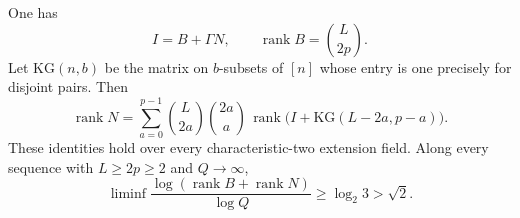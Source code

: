 \begin{proposition}
\label{prop:higher-car-grouping}
One has
\[
 I=B+\Gamma N,\qquad \operatorname{rank}B=\binom L{2p}.
\]
Let $\mathrm{KG}(n,b)$ be the matrix on $b$-subsets of $[n]$ whose
entry is one precisely for disjoint pairs. Then
\begin{equation}\label{eq:higher-car-rank}
 \operatorname{rank}N
 =\sum_{a=0}^{p-1}\binom L{2a}\binom{2a}a\,
   \operatorname{rank}\bigl(I+\mathrm{KG}(L-2a,p-a)\bigr).
\end{equation}
These identities hold over every characteristic-two extension field.
Along every sequence with $L\ge2p\ge2$ and $Q\to\infty$,
\begin{equation}\label{eq:higher-car-exponent}
 \liminf\frac{\log(\operatorname{rank}B+\operatorname{rank}N)}
                  {\log Q}
 \ge\log_2 3>\sqrt2.
\end{equation}
\end{proposition}
